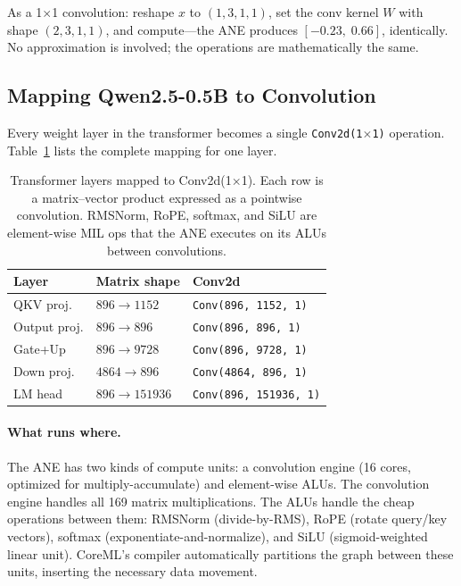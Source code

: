 \documentclass[11pt,twocolumn]{article}
\begin{document}
As a 1$\times$1 convolution: reshape $x$ to $(1, 3, 1, 1)$, set the
conv kernel $W$ with shape $(2, 3, 1, 1)$, and compute---the ANE
produces $[{-}0.23,\; 0.66]$, identically.  No approximation is
involved; the operations are mathematically the same.

\subsection{Mapping Qwen2.5-0.5B to Convolution}

Every weight layer in the transformer becomes a single
\texttt{Conv2d(1$\times$1)} operation.  Table~\ref{tab:conv_mapping}
lists the complete mapping for one layer.

\begin{table}[t]
\centering
\footnotesize
\begin{tabular}{lll}
\toprule
\textbf{Layer} & \textbf{Matrix shape} & \textbf{Conv2d} \\
\midrule
QKV proj. & $896 \to 1152$ & \texttt{Conv(896, 1152, 1)} \\
Output proj. & $896 \to 896$ & \texttt{Conv(896, 896, 1)} \\
Gate+Up & $896 \to 9728$ & \texttt{Conv(896, 9728, 1)} \\
Down proj. & $4864 \to 896$ & \texttt{Conv(4864, 896, 1)} \\
LM head & $896 \to 151936$ & \texttt{Conv(896, 151936, 1)} \\
\bottomrule
\end{tabular}
\caption{Transformer layers mapped to Conv2d(1$\times$1).  Each row
is a matrix--vector product expressed as a pointwise convolution.
RMSNorm, RoPE, softmax, and SiLU are element-wise MIL ops that the
ANE executes on its ALUs between convolutions.}
\label{tab:conv_mapping}
\end{table}

\paragraph{What runs where.}
The ANE has two kinds of compute units: a convolution engine (16
cores, optimized for multiply-accumulate) and element-wise ALUs.
The convolution engine handles all 169 matrix multiplications.
The ALUs handle the cheap operations between them: RMSNorm
(divide-by-RMS), RoPE (rotate query/key vectors), softmax
(exponentiate-and-normalize), and SiLU (sigmoid-weighted linear
unit).  CoreML's compiler automatically partitions the graph between
these units, inserting the necessary data movement.
\end{document}
